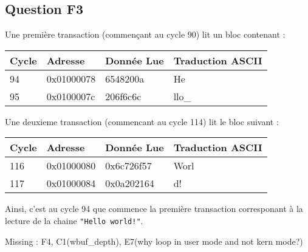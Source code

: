 \documentclass{article}
\begin{document}
\subsection{Question F3}

Une première transaction (commençant au cycle 90) lit un bloc contenant :
\begin{table}[H]
\centering
\begingroup
\setlength{\tabcolsep}{5pt}
\renewcommand{\arraystretch}{1.1}
\begin{tabular}{| l | l | l | l |}
\hline
Cycle	& Adresse	& Donnée Lue	& Traduction ASCII \\
\hline
94	& 0x01000078	& 6548200a	& He \\
\hline
95	& 0x0100007c	& 206f6c6c	& llo\_ \\
\hline
\end{tabular}
\endgroup
\end{table}


Une deuxieme transaction (commencant au cycle 114) lit le bloc suivant :
\begin{table}[H]
\centering
\begingroup
\setlength{\tabcolsep}{5pt}
\renewcommand{\arraystretch}{1.1}
\begin{tabular}{| l | l | l | l|}
\hline
Cycle	& Adresse	& Donnée Lue	& Traduction ASCII \\
\hline
116	& 0x01000080	& 0x6c726f57	& Worl \\
117	& 0x01000084	& 0x0a202164	& d! \\
\hline
\end{tabular}
\endgroup
\end{table}

Ainsi, c'est au cycle 94 que commence la première transaction corresponant
à la lecture de la chaine \texttt{"Hello world!"}.


Missing : F4, C1(wbuf\_depth), E7(why loop in user mode and not kern mode?)

\end{document}
